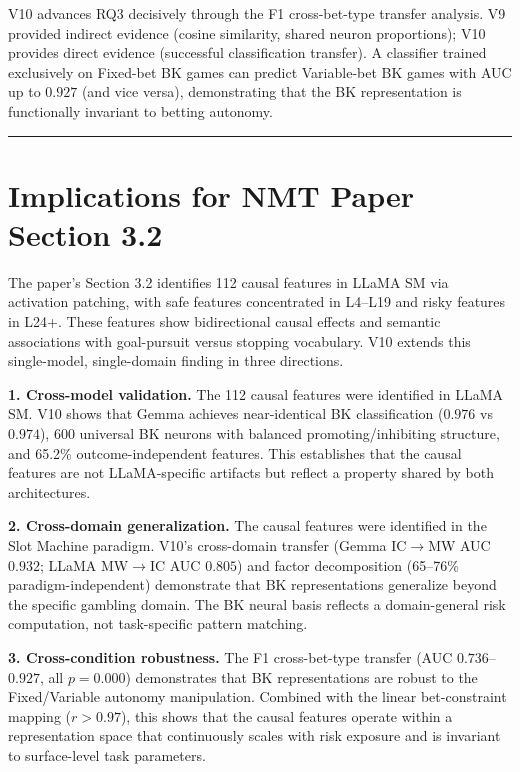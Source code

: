 \documentclass[11pt,a4paper]{article}
\begin{document}
\noindent V10 advances RQ3 decisively through the F1 cross-bet-type transfer analysis. V9 provided indirect evidence (cosine similarity, shared neuron proportions); V10 provides direct evidence (successful classification transfer). A classifier trained exclusively on Fixed-bet BK games can predict Variable-bet BK games with AUC up to $0.927$ (and vice versa), demonstrating that the BK representation is functionally invariant to betting autonomy.

\bigskip\hrule\bigskip

\section{Implications for NMT Paper Section 3.2}

The paper's Section 3.2 identifies 112 causal features in LLaMA SM via activation patching, with safe features concentrated in L4--L19 and risky features in L24+. These features show bidirectional causal effects and semantic associations with goal-pursuit versus stopping vocabulary. V10 extends this single-model, single-domain finding in three directions.

\medskip\noindent\textbf{1. Cross-model validation.} The 112 causal features were identified in LLaMA SM. V10 shows that Gemma achieves near-identical BK classification ($0.976$ vs $0.974$), 600 universal BK neurons with balanced promoting/inhibiting structure, and 65.2\% outcome-independent features. This establishes that the causal features are not LLaMA-specific artifacts but reflect a property shared by both architectures.

\medskip\noindent\textbf{2. Cross-domain generalization.} The causal features were identified in the Slot Machine paradigm. V10's cross-domain transfer (Gemma IC$\rightarrow$MW AUC $0.932$; LLaMA MW$\rightarrow$IC AUC $0.805$) and factor decomposition (65--76\% paradigm-independent) demonstrate that BK representations generalize beyond the specific gambling domain. The BK neural basis reflects a domain-general risk computation, not task-specific pattern matching.

\medskip\noindent\textbf{3. Cross-condition robustness.} The F1 cross-bet-type transfer (AUC $0.736$--$0.927$, all $p=0.000$) demonstrates that BK representations are robust to the Fixed/Variable autonomy manipulation. Combined with the linear bet-constraint mapping ($r > 0.97$), this shows that the causal features operate within a representation space that continuously scales with risk exposure and is invariant to surface-level task parameters.
\end{document}
